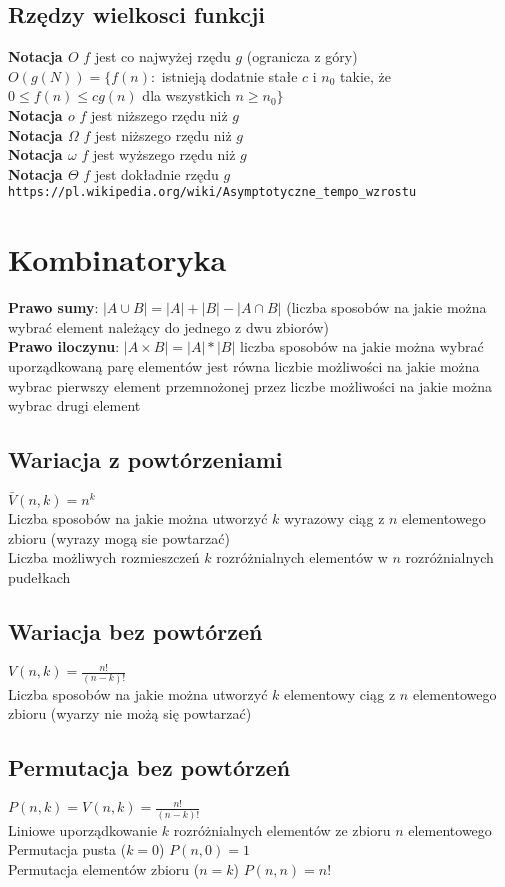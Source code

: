 \documentclass[a4paper,12pt]{article}
\begin{document}
\subsection{Rzędzy wielkosci funkcji}
\textbf{Notacja $O$} $f$ jest co najwyżej rzędu $g$ (ogranicza z góry)\\
$O(g(N))=\{f(n):$ istnieją dodatnie stałe $c$ i $n_0$ takie, że $0\leq f(n) \leq cg(n)$ dla wszystkich $n \geq n_0 \}$\\
\textbf{Notacja $o$} $f$ jest niższego rzędu niż $g$ \\
\textbf{Notacja $\Omega$} $f$ jest niższego rzędu niż $g$\\
\textbf{Notacja $\omega$} $f$ jest wyższego rzędu niż $g$ \\
\textbf{Notacja $\Theta$} $f$ jest dokładnie rzędu $g$\\
\verb+https://pl.wikipedia.org/wiki/Asymptotyczne_tempo_wzrostu+\\

\section{Kombinatoryka}
\textbf{Prawo sumy}: $|A \cup B|=|A|+|B|-|A \cap B|$ (liczba sposobów na jakie można wybrać element należący do jednego z dwu zbiorów) \\
\textbf{Prawo iloczynu}: $|A\times B|=|A|*|B|$ liczba sposobów na jakie można wybrać uporządkowaną parę elementów jest równa liczbie możliwości na jakie można wybrac pierwszy element przemnożonej przez liczbe możliwości na jakie można wybrac drugi element 
\subsection{Wariacja z powtórzeniami} $\bar V (n, k)=n^k$ \\
Liczba sposobów na jakie można utworzyć $k$ wyrazowy ciąg z $n$ elementowego zbioru (wyrazy mogą sie powtarzać) \\
Liczba możliwych rozmieszczeń $k$ rozróżnialnych elementów w $n$ rozróżnialnych pudełkach 
\subsection{Wariacja bez powtórzeń} $V(n,k)=\frac{n!}{(n-k)!}$ \\
Liczba sposobów na jakie można utworzyć $k$ elementowy ciąg z $n$ elementowego zbioru (wyarzy nie możą się powtarzać)
\subsection{Permutacja bez powtórzeń} $P(n,k)=V(n,k)=\frac{n!}{(n-k)!}$\\
Liniowe uporządkowanie $k$ rozróżnialnych elementów ze zbioru $n$ elementowego \\
Permutacja pusta ($k=0$) $P(n,0)=1$ \\
Permutacja elementów zbioru ($n=k$) $P(n, n)=n!$
\end{document}
